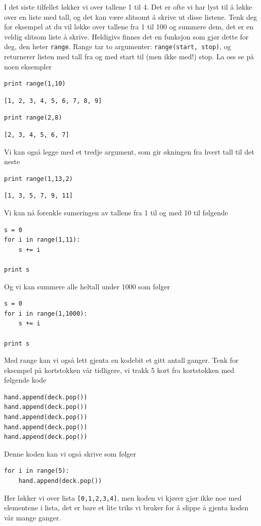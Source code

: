 \documentclass[a4paper, 11pt, notitlepage]{article}
\begin{document}
I det siste tilfellet løkker vi over tallene 1 til 4. Det er ofte vi har lyst til å løkke over en liste med tall, og det kan være slitsomt å skrive ut disse listene. Tenk deg for eksempel at du vil løkke over tallene fra 1 til 100 og summere dem, det er en veldig slitsom liste å skrive. Heldigivs finnes det en funksjon som gjør dette for deg, den heter \verb+range+. Range tar to 
argumenter: \verb+range(start, stop)+, og returnerer listen med tall fra og med start til (men ikke med!) stop. La oss se på noen eksempler
\begin{lstlisting}
print range(1,10)
\end{lstlisting}
\vspace{-0.5cm}
\begin{verbatim}
[1, 2, 3, 4, 5, 6, 7, 8, 9]
\end{verbatim}
\begin{lstlisting}
print range(2,8)
\end{lstlisting}
\vspace{-0.5cm}
\begin{verbatim}
[2, 3, 4, 5, 6, 7]
\end{verbatim}

Vi kan også legge med et tredje argument, som gir økningen fra hvert tall til det neste
\begin{lstlisting}
print range(1,13,2)
\end{lstlisting}
\vspace{-0.5cm}
\begin{verbatim}
[1, 3, 5, 7, 9, 11]
\end{verbatim}

Vi kan nå forenkle sumeringen av tallene fra 1 til og med 10 til følgende
\begin{lstlisting}
s = 0
for i in range(1,11):
	s += i

print s
\end{lstlisting}
Og vi kan summere alle heltall under 1000 som følger
\begin{lstlisting}
s = 0
for i in range(1,1000):
	s += i

print s
\end{lstlisting}

Med range kan vi også lett gjenta en kodebit et gitt antall ganger. Tenk for eksempel på kortstokken vår tidligere, vi trakk 5 kort fra kortstokken med følgende kode
\begin{lstlisting}
hand.append(deck.pop())
hand.append(deck.pop())
hand.append(deck.pop())
hand.append(deck.pop())
hand.append(deck.pop())
\end{lstlisting}
Denne koden kan vi også skrive som følger
\begin{lstlisting}
for i in range(5):
	hand.append(deck.pop())
\end{lstlisting}
Her løkker vi over lista \verb+[0,1,2,3,4]+, men koden vi kjører gjør ikke noe med elementene i lista, det er bare et lite triks vi bruker for å slippe å gjenta koden vår mange ganger.
\end{document}
